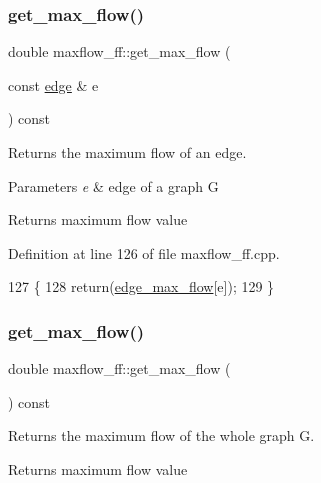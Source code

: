 \subsubsection{\texorpdfstring{get\+\_\+max\+\_\+flow()}{get\_max\_flow()}\hspace{0.1cm}{\footnotesize\ttfamily [1/2]}}
{\footnotesize\ttfamily double maxflow\+\_\+ff\+::get\+\_\+max\+\_\+flow (\begin{DoxyParamCaption}\item[{const \mbox{\hyperlink{classedge}{edge}} \&}]{e }\end{DoxyParamCaption}) const}

Returns the maximum flow of an edge.


\begin{DoxyParams}{Parameters}
{\em e} & edge of a graph G \\
\hline
\end{DoxyParams}
\begin{DoxyReturn}{Returns}
maximum flow value 
\end{DoxyReturn}


Definition at line 126 of file maxflow\+\_\+ff.\+cpp.


\begin{DoxyCode}
127 \{
128     \textcolor{keywordflow}{return}(\mbox{\hyperlink{classmaxflow__ff_a669f36f1fae2dd0f6cfc0172e3ae0e8f}{edge\_max\_flow}}[e]);
129 \}
\end{DoxyCode}
\mbox{\label{classmaxflow__ff_a04d1ea509c13e500b62cad061ee8a2b9}} 
\subsubsection{\texorpdfstring{get\+\_\+max\+\_\+flow()}{get\_max\_flow()}\hspace{0.1cm}{\footnotesize\ttfamily [2/2]}}
{\footnotesize\ttfamily double maxflow\+\_\+ff\+::get\+\_\+max\+\_\+flow (\begin{DoxyParamCaption}{ }\end{DoxyParamCaption}) const}

Returns the maximum flow of the whole graph G.

\begin{DoxyReturn}{Returns}
maximum flow value 
\end{DoxyReturn}


